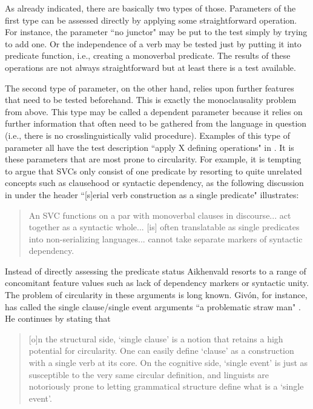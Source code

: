 As already indicated, there are basically two types of those. Parameters of the first type can be assessed directly by applying some straightforward operation. For instance, the parameter ``no junctor" may be put to the test simply by trying to add one. Or the independence of a verb may be tested just by putting it into predicate function, i.e., creating a monoverbal predicate. The results of these operations are not always straightforward but at least there is a test available. 

The second type of parameter, on the other hand, relies upon further features that need to be tested beforehand. This is exactly the monoclausality problem from above. This type may be called a dependent parameter because it relies on further information that often need to be gathered from the language in question (i.e., there is no crosslinguistically valid procedure). Examples of this type of parameter all have the test description ``apply X defining operations" in . It is these parameters that are most prone to circularity. For example, it is tempting to argue that SVCs only consist of one predicate by resorting to quite unrelated concepts such as clausehood or syntactic dependency, as the following discussion in \citet[4]{Aikhenvald2006} under the header ``[s]erial verb construction as a single predicate" illustrates:
\begin{quote}An SVC functions on a par with monoverbal clauses in discourse... act together as a syntactic whole... [is] often translatable as single predicates into non-serializing languages... cannot take separate markers of syntactic dependency.\end{quote} 

Instead of directly assessing the predicate status Aikhenvald resorts to a range of concomitant feature values such as lack of dependency markers or syntactic unity. The problem of circularity in these arguments is long known. Givón, for instance, has called the single clause/single event arguments ``a problematic straw man" \citep[84]{givon1991serial}. He continues by stating that
\begin{quote}[o]n the structural side, `single clause' is a notion that retains a high potential for circularity. One can
easily define `clause' as a construction with a single verb at its core. On the cognitive side, `single event' is just as susceptible to the very same circular definition, and linguists are notoriously prone to letting grammatical structure define what is a `single event'.\end{quote}

